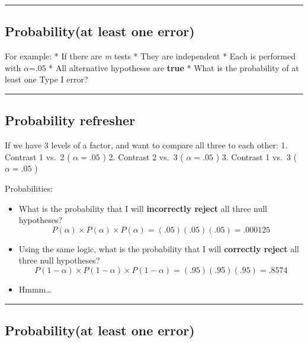 \documentclass[]{article}
\begin{document}
\begin{center}\rule{0.5\linewidth}{\linethickness}\end{center}

\hypertarget{probabilityat-least-one-error}{%
\subsection{Probability(at least one
error)}\label{probabilityat-least-one-error}}

For example: * If there are \emph{m} tests * They are independent * Each
is performed with \(\alpha\)=.05 * All alternative hypotheses are
\textbf{true} * What is the probability of at least one Type I error?

\begin{center}\rule{0.5\linewidth}{\linethickness}\end{center}

\hypertarget{probability-refresher}{%
\subsection{Probability refresher}\label{probability-refresher}}

If we have 3 levels of a factor, and want to compare all three to each
other: 1. Contrast 1 vs.~2 ( \(\alpha=.05\) ) 2. Contrast 2 vs.~3 (
\(\alpha=.05\) ) 3. Contrast 1 vs.~3 ( \(\alpha=.05\) )

Probabilities:

\begin{itemize}
\item
  What is the probability that I will \textbf{incorrectly reject} all
  three null hypotheses?
  \[P(\alpha)\times{P(\alpha)}\times{P(\alpha)}=(.05)(.05)(.05)=.000125\]
\item
  Using the same logic, what is the probability that I will
  \textbf{correctly reject} all three null hypotheses?
  \[P(1-\alpha)\times{P(1-\alpha)}\times{P(1-\alpha)}=(.95)(.95)(.95)=.8574\]
\item
  Hmmm\ldots{}
\end{itemize}

\begin{center}\rule{0.5\linewidth}{\linethickness}\end{center}

\hypertarget{probabilityat-least-one-error-1}{%
\subsection{Probability(at least one
error)}\label{probabilityat-least-one-error-1}}
\end{document}
